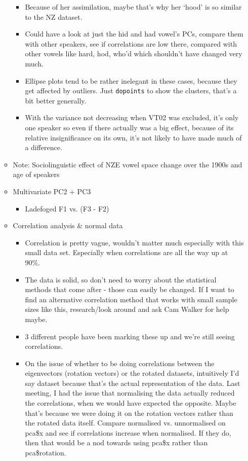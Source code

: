\documentclass{article}
\begin{document}
\begin{itemize}
\begin{itemize}
\begin{itemize}
            \item Because of her assimilation, maybe that's why her `hood' is so similar to the NZ dataset.
            \item Could have a look at just the hid and had vowel's PCs, compare them with other speakers, see if correlations are low there, compared with other vowels like hard, hod, who'd which shouldn't have changed very much.
            \item Ellipse plots tend to be rather inelegant in these cases, because they get affected by outliers. Just \verb|dopoints| to show the clusters, that's a bit better generally.
            \item With the variance not decreasing when VT02 was excluded, it's only one speaker so even if there actually was a big effect, because of its relative insignificance on its own, it's not likely to have made much of a difference.
        \end{itemize}
        \item Note: Sociolinguistic effect of NZE vowel space change over the 1900s and age of speakers
        \item Multivariate PC2 + PC3
        \begin{itemize}
            \item Ladefoged F1 vs. (F3 - F2)
        \end{itemize}
        \item Correlation analysis & normal data
        \begin{itemize}
            \item Correlation is pretty vague, wouldn't matter much especially with this small data set. Especially when correlations are all the way up at 90\%.
            \item The data is solid, so don't need to worry about the statistical methods that come after - those can easily be changed. If I want to find an alternative correlation method that works with small sample sizes like this, research/look around and ask Cam Walker for help maybe.
            \item 3 different people have been marking these up and we're still seeing correlations.
            \item On the issue of whether to be doing correlations between the eigenvectors (rotation vectors) or the rotated datasets, intuitively I'd say dataset because that's the actual representation of the data. Last meeting, I had the issue that normalising the data actually reduced the correlations, when we would have expected the opposite. Maybe that's because we were doing it on the rotation vectors rather than the rotated data itself. Compare normalised vs. unnormalised on pca\$x and see if correlations increase when normalised. If they do, then that would be a nod towards using pca\$x rather than pca\$rotation.

\end{itemize}
\end{itemize}
\end{itemize}
\end{document}
